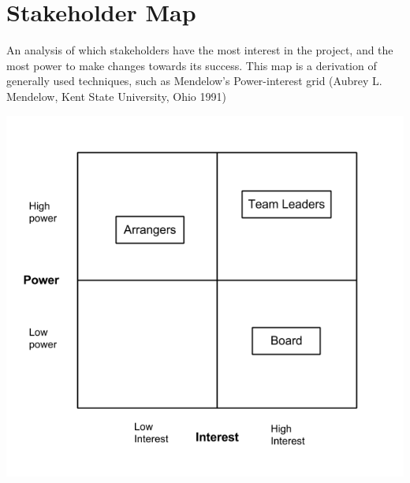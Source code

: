 \section{Stakeholder Map} %
\label{sec:stakeholder_map}
An analysis of which stakeholders have the most interest in the project, and the most power to make changes towards its success.
This map is a derivation of generally used techniques, such as Mendelow's Power-interest grid (Aubrey L. Mendelow, Kent State University, Ohio 1991)

\includegraphics[scale=0.75]{Pictures/Stakeholder_Map_Interest_Power.png}